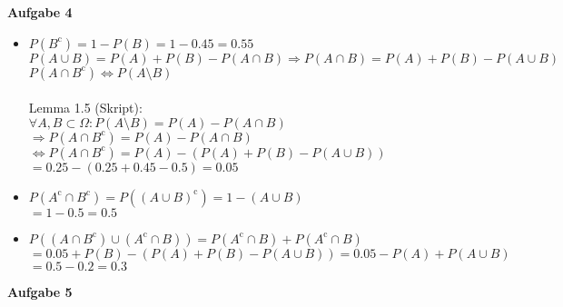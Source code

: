 \documentclass[a4paper,12pt]{article}
\newcommand{\Aufgabe}[1]{
        {
        \vspace*{0.5cm}
        \textbf{Aufgabe #1}
        \vspace*{0.2cm}
    }
}
\begin{document}
    \Aufgabe{4}\\
    \begin{itemize}
        \item
        $ P(B^{\mathrm{c}}) = 1 - P(B) = 1 - 0.45 = 0.55 $ \\
        $ P(A \cup B) = P(A) + P(B) - P(A \cap B) \Rightarrow P(A \cap B) = P(A) + P(B) - P(A \cup B) $ \\
        $ P(A \cap B^{\mathrm{c}}) \Leftrightarrow P(A \setminus B) $ \\ \\
        Lemma 1.5 (Skript):\\ $ \forall A,B \subset \Omega : P(A \setminus B) = P(A) - P(A \cap B) $ \\
        $ \Rightarrow P(A \cap B^{\mathrm{c}}) = P(A) - P(A \cap B) $ \\
        $ \Leftrightarrow P(A \cap B^{\mathrm{c}}) = P(A) - (P(A) + P(B) - P(A \cup B)) $ \\
        $ = 0.25 - (0.25 + 0.45 - 0.5) = 0.05 $ \\
        \item
        $ P(A^{\mathrm{c}} \cap B^{\mathrm{c}}) = P((A \cup B)^{\mathrm{c}}) = 1 - (A \cup B) $ \\
        $ = 1 - 0.5 = 0.5 $
        \item
        $ P((A \cap B^{\mathrm{c}}) \cup (A^{\mathrm{c}} \cap B)) = P(A^{\mathrm{c}} \cap B) + P(A^{\mathrm{c}} \cap B) $ \\
        $ = 0.05 + P(B) - (P(A) + P(B) - P(A \cup B)) = 0.05 - P(A) + P(A \cup B) $ \\
        $ = 0.5 - 0.2 = 0.3 $
    \end{itemize}

    \Aufgabe{5}


\end{document}
